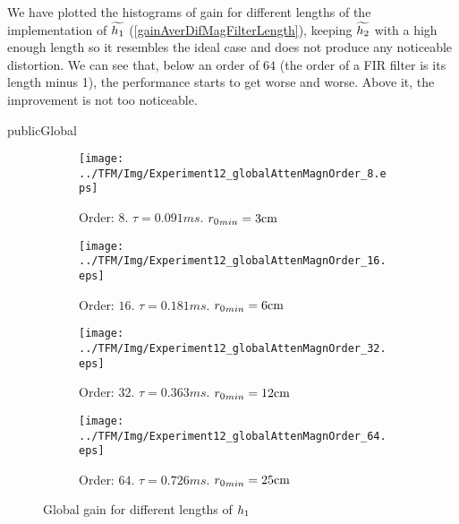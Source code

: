 We have plotted the histograms of gain for different lengths of the implementation of $\widetilde{\freqFilter[time][magnitude]}$ (\autoref{gainAverDifMagFilterLength}), keeping $\widetilde{\freqFilter[time][phase]}$ with a high enough length so it resembles the ideal case and does not produce any noticeable distortion. We can see that, below an order of $64$ (the order of a FIR filter is its length minus 1), the performance starts to get worse and worse. Above it, the improvement is not too noticeable.
\begin{shownto}{publicGlobal}
\begin{figure}[h]
	\centering
	\begin{subfigure}[b]{0.45\textwidth}
		\centering
		\texttt{[image: ../TFM/Img/Experiment12\_globalAttenMagnOrder\_8.eps]}
		\caption{Order: $8$. $\tau = 0.091 \si{ms}$. ${\distLinePrimSource}_{min} = 3\si{cm}$}
	\end{subfigure}
	\begin{subfigure}[b]{0.45\textwidth}
		\centering
		\texttt{[image: ../TFM/Img/Experiment12\_globalAttenMagnOrder\_16.eps]}
		\caption{Order: $16$. $\tau = 0.181 \si{ms}$. ${\distLinePrimSource}_{min} = 6\si{cm}$}
	\end{subfigure}
	\begin{subfigure}[b]{0.45\textwidth}
		\centering
		\texttt{[image: ../TFM/Img/Experiment12\_globalAttenMagnOrder\_32.eps]}
		\caption{Order: $32$. $\tau = 0.363 \si{ms}$. ${\distLinePrimSource}_{min} = 12\si{cm}$}
	\end{subfigure}
	\begin{subfigure}[b]{0.45\textwidth}
		\centering
		\texttt{[image: ../TFM/Img/Experiment12\_globalAttenMagnOrder\_64.eps]}
		\caption{Order: $64$. $\tau = 0.726 \si{ms}$. ${\distLinePrimSource}_{min} = 25\si{cm}$}
	\end{subfigure}
	
	\caption{Global gain for different lengths of $\freqFilter[time][magnitude]$}
	\label{globCancDifMagFilterLength}
\end{figure}
\end{shownto}
